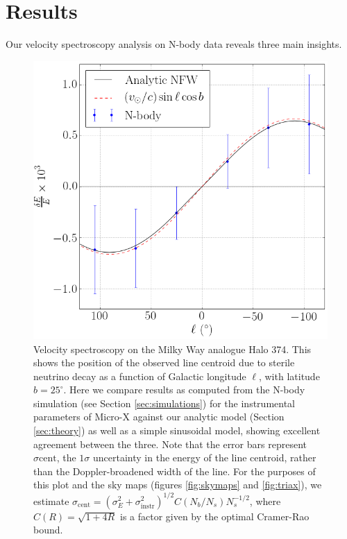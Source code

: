 \documentclass[aps,prd,10pt,twocolumn,superscriptaddress,showpacs]{revtex4-1}
\begin{document}
\section{Results}
\label{sec:results}

Our velocity spectroscopy analysis on N-body data reveals three main insights.

\begin{figure}[h!]
\centering
\includegraphics[width=1.0\columnwidth]{de_vs_l.png}
\caption{Velocity spectroscopy on the Milky Way analogue Halo 374. This shows the position of the observed line centroid due to sterile
	neutrino decay as a function of Galactic longitude $\ell$, with latitude $b=25^\circ$.
	Here we compare results as computed from the N-body simulation (see Section \ref{sec:simulations}) for the
	instrumental parameters of Micro-X against our analytic model (Section
	\ref{sec:theory}) as well as a simple sinusoidal model, showing excellent agreement between the
	three. Note that the error bars represent $\sigma\mathrm{cent}$, the $1\sigma$ uncertainty
	in the energy of the line centroid, rather than the Doppler-broadened width of the line. For the
	purposes of this plot and the sky maps (figures \ref{fig:skymaps} and \ref{fig:triax}), we estimate
	$\sigma_\mathrm{cent} = (\sigma_E^2+\sigma_\mathrm{instr}^2)^{1/2}C(N_b/N_s)N_s^{-1/2}$, where
	$C(R)=\sqrt{1+4R}$ is a factor given by the optimal Cramer-Rao bound.}
\label{fig:de_vs_l}
\end{figure}
\end{document}
